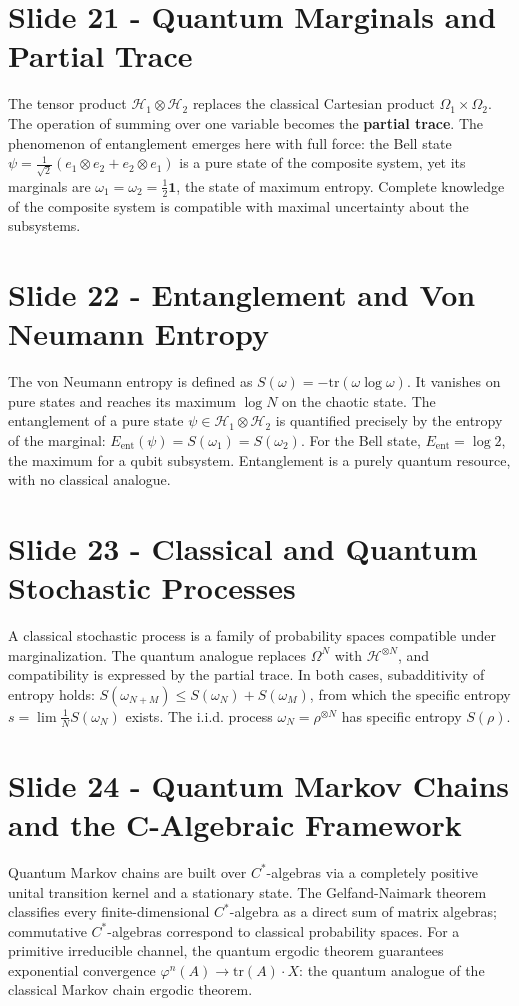 \documentclass{article}
\begin{document}
\section*{Slide 21 - Quantum Marginals and Partial Trace}
The tensor product $\mathcal{H}_1 \otimes \mathcal{H}_2$ replaces the classical Cartesian product $\Omega_1 \times \Omega_2$. The operation of summing over one variable becomes the \textbf{partial trace}. The phenomenon of entanglement emerges here with full force: the Bell state $\psi = \frac{1}{\sqrt{2}}(e_1 \otimes e_2 + e_2 \otimes e_1)$ is a pure state of the composite system, yet its marginals are $\omega_1 = \omega_2 = \frac{1}{2}\mathbf{1}$, the state of maximum entropy. Complete knowledge of the composite system is compatible with maximal uncertainty about the subsystems.

\section*{Slide 22 - Entanglement and Von Neumann Entropy}
The von Neumann entropy is defined as $S(\omega) = -\mathrm{tr}(\omega \log \omega)$. It vanishes on pure states and reaches its maximum $\log N$ on the chaotic state. The entanglement of a pure state $\psi \in \mathcal{H}_1 \otimes \mathcal{H}_2$ is quantified precisely by the entropy of the marginal: $E_\mathrm{ent}(\psi) = S(\omega_1) = S(\omega_2)$. For the Bell state, $E_\mathrm{ent} = \log 2$, the maximum for a qubit subsystem. Entanglement is a purely quantum resource, with no classical analogue.

\section*{Slide 23 - Classical and Quantum Stochastic Processes}
A classical stochastic process is a family of probability spaces compatible under marginalization. The quantum analogue replaces $\Omega^N$ with $\mathcal{H}^{\otimes N}$, and compatibility is expressed by the partial trace. In both cases, subadditivity of entropy holds: $S(\omega_{N+M}) \leq S(\omega_N) + S(\omega_M)$, from which the specific entropy $s = \lim \frac{1}{N} S(\omega_N)$ exists. The i.i.d. process $\omega_N = \rho^{\otimes N}$ has specific entropy $S(\rho)$.

\section*{Slide 24 - Quantum Markov Chains and the C-Algebraic Framework}
Quantum Markov chains are built over $C^*$-algebras via a completely positive unital transition kernel and a stationary state. The Gelfand-Naimark theorem classifies every finite-dimensional $C^*$-algebra as a direct sum of matrix algebras; commutative $C^*$-algebras correspond to classical probability spaces. For a primitive irreducible channel, the quantum ergodic theorem guarantees exponential convergence $\varphi^n(A) \to \mathrm{tr}(A) \cdot X$: the quantum analogue of the classical Markov chain ergodic theorem.
\end{document}
